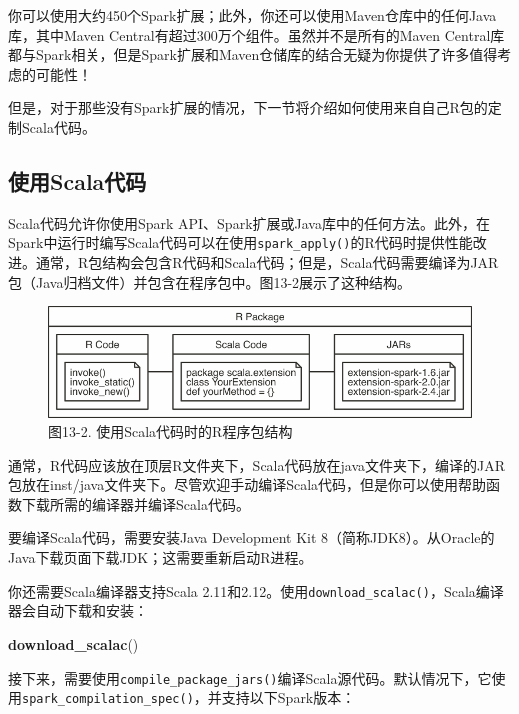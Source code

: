 \documentclass[
]{article}
\newenvironment{Shaded}{\begin{snugshade}}{\end{snugshade}}
\newcommand{\KeywordTok}[1]{\textcolor[rgb]{0.13,0.29,0.53}{\textbf{#1}}}
\newcommand{\NormalTok}[1]{#1}
\begin{document}
你可以使用大约450个Spark扩展；此外，你还可以使用Maven仓库中的任何Java库，其中Maven
Central有超过300万个组件。虽然并不是所有的Maven
Central库都与Spark相关，但是Spark扩展和Maven仓储库的结合无疑为你提供了许多值得考虑的可能性！

但是，对于那些没有Spark扩展的情况，下一节将介绍如何使用来自自己R包的定制Scala代码。

\hypertarget{ux4f7fux7528scalaux4ee3ux7801}{%
\subsection{使用Scala代码}\label{ux4f7fux7528scalaux4ee3ux7801}}

Scala代码允许你使用Spark
API、Spark扩展或Java库中的任何方法。此外，在Spark中运行时编写Scala代码可以在使用\texttt{spark\_apply()}的R代码时提供性能改进。通常，R包结构会包含R代码和Scala代码；但是，Scala代码需要编译为JAR包（Java归档文件）并包含在程序包中。图13-2展示了这种结构。

\begin{figure}
\centering
\includegraphics{figures/13_2.png}
\caption{图13-2. 使用Scala代码时的R程序包结构}
\end{figure}

通常，R代码应该放在顶层R文件夹下，Scala代码放在java文件夹下，编译的JAR包放在inst/java文件夹下。尽管欢迎手动编译Scala代码，但是你可以使用帮助函数下载所需的编译器并编译Scala代码。

要编译Scala代码，需要安装Java Development Kit
8（简称JDK8）。从Oracle的Java下载页面下载JDK；这需要重新启动R进程。

你还需要Scala编译器支持Scala
2.11和2.12。使用\texttt{download\_scalac()}，Scala编译器会自动下载和安装：

\begin{Shaded}
\begin{Highlighting}[]
\KeywordTok{download_scalac}\NormalTok{()}
\end{Highlighting}
\end{Shaded}

接下来，需要使用\texttt{compile\_package\_jars()}编译Scala源代码。默认情况下，它使用\texttt{spark\_compilation\_spec()}，并支持以下Spark版本：
\end{document}
